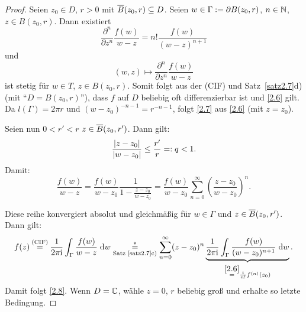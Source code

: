 \documentclass[a4paper,twoside,DIV15,BCOR12mm]{scrbook}
\begin{document}
\begin{proof}
Seien $z_0\in D$, $r > 0$ mit $\overline{B}(z_0,r)\subseteq D$. Seien $w\in\Gamma:= \partial B(z_0,r)$, $n\in\mathbb{N}$, $z\in B(z_0,r)$. Dann existiert
\[\frac{\partial^n}{\partial z^n}\frac{f(w)}{w-z} = n!\frac{f(w)}{(w-z)^{n+1}}\]
und
\[(w,z)\mapsto \frac{\partial^n}{\partial z^n}\frac{f(w)}{w-z}\]
ist stetig für $w\in T$, $z\in B(z_0,r)$. Somit folgt aus der (CIF) und Satz~\ref{satz2.7}d) (mit ``$D=B(z_0,r)$''), dass $f$ auf $D$ beliebig oft differenzierbar ist und \eqref{2.6} gilt. Da $l(\Gamma) = 2\pi r$ und $(w-z_0)^{-n-1}=r^{-n-1}$, folgt \eqref{2.7} aus \eqref{2.6} (mit $z=z_0$).

Seien nun $0<r'<r$ $z\in\overline{B}(z_0,r')$. Dann gilt:
\[\frac{\left\lvert z-z_0\right\lvert}{\left\lvert w-z_0\right\lvert}\leq\frac{r'}{r}=: q < 1.\]
Damit:
\[\frac{f(w)}{w-z}=\frac{f(w)}{w-z_0}\frac{1}{1-\frac{z-z_0}{w-z_0}} = \frac{f(w)}{w-z_0}\sum_{n=0}^\infty\left(\frac{z-z_0}{w-z_0}\right)^n.\tag{$*$}\]

Diese reihe konvergiert absolut und gleichmäßig für $w\in\Gamma$ und $z\in\overline{B}(z_0,r')$. Dann gilt:
\[f(z)\!\!\nach{=}{(CIF)}\!\! \frac{1}{2\pi\i}\integral{\Gamma}{}{\frac{f(w)}{w-z}}{w} \underset{\text{Satz~\ref{satz2.7}c)}}{\overset{*}{=}} \sum_{n=0}^\infty (z-z_0)^n\underbrace{\frac{1}{2\pi\i}\integral{\Gamma}{}{\frac{f(w)}{(w-z_0)^{n+1}}}{w}}_{\overset{\eqref{2.6}}{=}\frac{1}{n!}f^{(n)}(z_0)}.\]
Damit folgt \eqref{2.8}. Wenn $D=\mathbb{C}$, wähle $z =0$, $r$ beliebig groß und erhalte so letzte Bedingung.
\end{proof}
\end{document}
